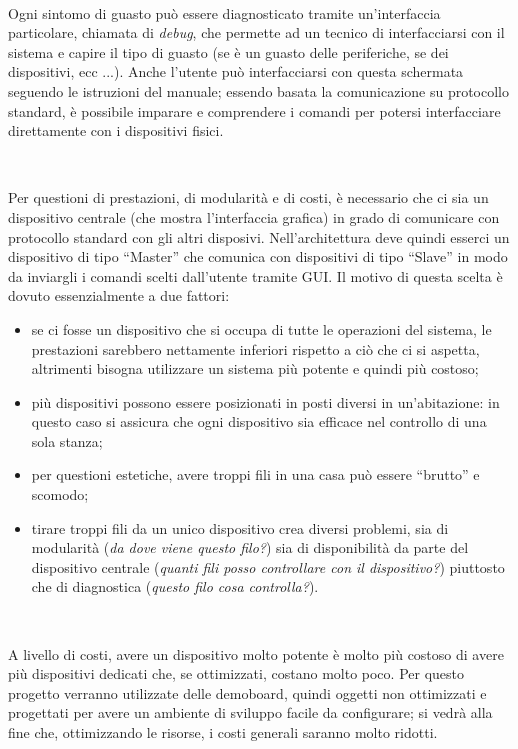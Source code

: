 \documentclass[a4paper,titlepage]{book}
\newcommand{\itema}{\begin{itemize}[noitemsep,topsep=10pt,parsep=5pt,partopsep=10pt]}
\begin{document}
~

Ogni sintomo di guasto può essere diagnosticato tramite un'interfaccia particolare, chiamata di \textit{debug}, che permette ad un tecnico di interfacciarsi con il sistema e capire il tipo di guasto (se è un guasto delle periferiche, se dei dispositivi, ecc ...). Anche l'utente può interfacciarsi con questa schermata seguendo le istruzioni del manuale; essendo basata la comunicazione su protocollo standard, è possibile imparare e comprendere i comandi per potersi interfacciare direttamente con i dispositivi fisici.  

~

Per questioni di prestazioni, di modularità e di costi, è necessario che ci sia un dispositivo centrale (che mostra l'interfaccia grafica) in grado di comunicare con protocollo standard con gli altri disposivi. Nell'architettura deve quindi esserci un dispositivo di tipo ``Master'' che comunica con dispositivi di tipo ``Slave'' in modo da inviargli i comandi scelti dall'utente tramite GUI. Il motivo di questa scelta è dovuto essenzialmente a due fattori:

\itema

\item se ci fosse un dispositivo che si occupa di tutte le operazioni del sistema, le prestazioni sarebbero nettamente inferiori rispetto a ciò che ci si aspetta, altrimenti bisogna utilizzare un sistema più potente e quindi più costoso;

\item più dispositivi possono essere posizionati in posti diversi in un'abitazione: in questo caso si assicura che ogni dispositivo sia efficace nel controllo di una sola stanza;

\item per questioni estetiche, avere troppi fili in una casa può essere ``brutto'' e scomodo;

\item tirare troppi fili da un unico dispositivo crea diversi problemi, sia di modularità (\textit{da dove viene questo filo?}) sia di disponibilità da parte del dispositivo centrale (\textit{quanti fili posso controllare con il dispositivo?}) piuttosto che di diagnostica (\textit{questo filo cosa controlla?}).


\end{itemize}

~

A livello di costi, avere un dispositivo molto potente è molto più costoso di avere più dispositivi dedicati che, se ottimizzati, costano molto poco.
Per questo progetto verranno utilizzate delle demoboard, quindi oggetti non ottimizzati e progettati per avere un ambiente di sviluppo facile da configurare; si vedrà alla fine che, ottimizzando le risorse, i costi generali saranno molto ridotti.
\end{document}
